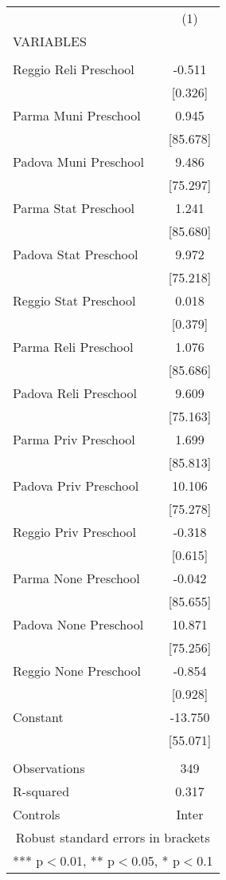 \begin{tabular}{lc} \hline
 & (1) \\
VARIABLES &  \\ \hline
 &  \\
Reggio Reli Preschool & -0.511 \\
 & [0.326] \\
Parma Muni Preschool & 0.945 \\
 & [85.678] \\
Padova Muni Preschool & 9.486 \\
 & [75.297] \\
Parma Stat Preschool & 1.241 \\
 & [85.680] \\
Padova Stat Preschool & 9.972 \\
 & [75.218] \\
Reggio Stat Preschool & 0.018 \\
 & [0.379] \\
Parma Reli Preschool & 1.076 \\
 & [85.686] \\
Padova Reli Preschool & 9.609 \\
 & [75.163] \\
Parma Priv Preschool & 1.699 \\
 & [85.813] \\
Padova Priv Preschool & 10.106 \\
 & [75.278] \\
Reggio Priv Preschool & -0.318 \\
 & [0.615] \\
Parma None Preschool & -0.042 \\
 & [85.655] \\
Padova None Preschool & 10.871 \\
 & [75.256] \\
Reggio None Preschool & -0.854 \\
 & [0.928] \\
Constant & -13.750 \\
 & [55.071] \\
 &  \\
Observations & 349 \\
R-squared & 0.317 \\
 Controls & Inter \\ \hline
\multicolumn{2}{c}{ Robust standard errors in brackets} \\
\multicolumn{2}{c}{ *** p$<$0.01, ** p$<$0.05, * p$<$0.1} \\
\end{tabular}
